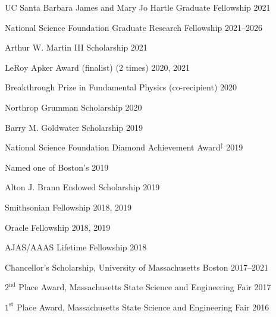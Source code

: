 \documentclass[margin,line]{res}
\begin{document}
\begin{resume}
\vspace*{-2mm}
UC Santa Barbara James and Mary Jo Hartle Graduate Fellowship  \hfill 2021

\vspace*{-2mm}
{\color{Maroon}National Science Foundation Graduate Research Fellowship  \hfill 2021--2026}

\vspace*{-2mm}
Arthur W. Martin III Scholarship \hfill 2021


\vspace*{-2mm}
{LeRoy Apker Award (finalist) (2 times)  \hfill 2020, 2021}

\vspace*{-2mm}
{\color{Maroon} Breakthrough Prize in Fundamental Physics (co-recipient) \hfill 2020}

\vspace*{-2mm}
Northrop Grumman Scholarship \hfill 2020


\vspace*{-2mm}
{\color{Maroon} Barry M. Goldwater Scholarship \hfill 2019}



\vspace*{-2mm}
National Science Foundation Diamond Achievement Award$^\ddag$ \hfill 2019



\vspace*{-2mm}
Named one of Boston's \textrm{} \hfill 2019
\newpage

\vspace*{-2mm}
Alton J. Brann Endowed Scholarship \hfill 2019

\vspace*{-2mm}
Smithsonian Fellowship \hfill 2018, 2019

\vspace*{-2mm}
Oracle Fellowship \hfill 2018, 2019

\vspace*{-2mm}
AJAS/AAAS Lifetime Fellowship \hfill 2018

\vspace*{-2mm}
Chancellor's Scholarship, University of Massachusetts Boston \hfill 2017--2021

\vspace*{-2mm}
$2^\textrm{nd}$ Place Award, Massachusetts State Science and Engineering Fair \hfill 2017

\vspace*{-2mm}
$1^\textrm{st}$ Place Award, Massachusetts State Science and Engineering Fair \hfill 2016



\end{resume}
\end{document}
